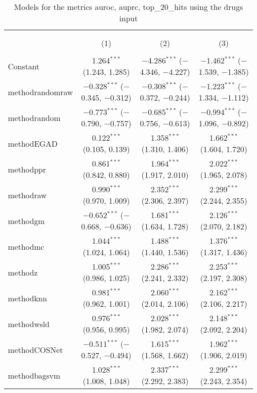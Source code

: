
\begin{table}[!htbp] \centering 
  \caption{Models for the metrics auroc, auprc, top_20_hits using the drugs input} 
  \label{} 
\begin{tabular}{@{\extracolsep{5pt}}lccc} 
\\[-1.8ex]\hline 
\hline \\[-1.8ex] 
\\[-1.8ex] & (1) & (2) & (3)\\ 
\hline \\[-1.8ex] 
 Constant & 1.264$^{***}$ (1.243, 1.285) & $-$4.286$^{***}$ ($-$4.346, $-$4.227) & $-$1.462$^{***}$ ($-$1.539, $-$1.385) \\ 
  methodrandomraw & $-$0.328$^{***}$ ($-$0.345, $-$0.312) & $-$0.308$^{***}$ ($-$0.372, $-$0.244) & $-$1.223$^{***}$ ($-$1.334, $-$1.112) \\ 
  methodrandom & $-$0.773$^{***}$ ($-$0.790, $-$0.757) & $-$0.685$^{***}$ ($-$0.756, $-$0.613) & $-$0.994$^{***}$ ($-$1.096, $-$0.892) \\ 
  methodEGAD & 0.122$^{***}$ (0.105, 0.139) & 1.358$^{***}$ (1.310, 1.406) & 1.662$^{***}$ (1.604, 1.720) \\ 
  methodppr & 0.861$^{***}$ (0.842, 0.880) & 1.964$^{***}$ (1.917, 2.010) & 2.022$^{***}$ (1.965, 2.078) \\ 
  methodraw & 0.990$^{***}$ (0.970, 1.009) & 2.352$^{***}$ (2.306, 2.397) & 2.299$^{***}$ (2.244, 2.355) \\ 
  methodgm & $-$0.652$^{***}$ ($-$0.668, $-$0.636) & 1.681$^{***}$ (1.634, 1.728) & 2.126$^{***}$ (2.070, 2.182) \\ 
  methodmc & 1.044$^{***}$ (1.024, 1.064) & 1.488$^{***}$ (1.440, 1.536) & 1.376$^{***}$ (1.317, 1.436) \\ 
  methodz & 1.005$^{***}$ (0.986, 1.025) & 2.286$^{***}$ (2.241, 2.332) & 2.253$^{***}$ (2.197, 2.308) \\ 
  methodknn & 0.981$^{***}$ (0.962, 1.001) & 2.060$^{***}$ (2.014, 2.106) & 2.162$^{***}$ (2.106, 2.217) \\ 
  methodwsld & 0.976$^{***}$ (0.956, 0.995) & 2.028$^{***}$ (1.982, 2.074) & 2.148$^{***}$ (2.092, 2.204) \\ 
  methodCOSNet & $-$0.511$^{***}$ ($-$0.527, $-$0.494) & 1.615$^{***}$ (1.568, 1.662) & 1.962$^{***}$ (1.906, 2.019) \\ 
  methodbagsvm & 1.028$^{***}$ (1.008, 1.048) & 2.337$^{***}$ (2.292, 2.383) & 2.299$^{***}$ (2.243, 2.354) \\ 

\end{tabular}
\end{table}
